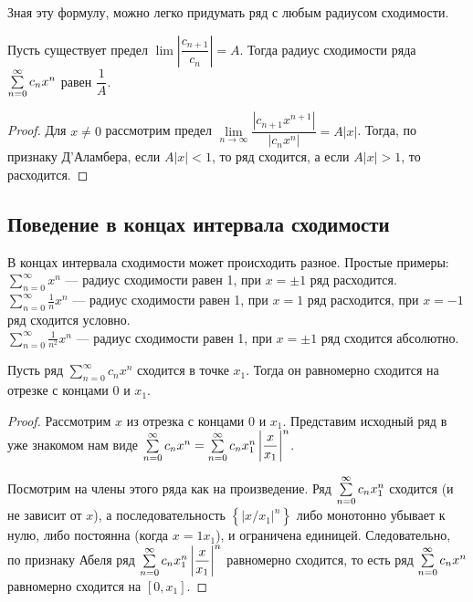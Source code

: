 \documentclass[a4paper, 12pt]{article}
\begin{document}
Зная эту формулу, можно легко придумать ряд с любым радиусом сходимости.

\begin{Statement}
Пусть существует предел $\lim \left|\dfrac{c_{n+1}}{c_n}  \right| = A$. Тогда радиус сходимости ряда $\sum\limits_{n=0}^{\infty} c_nx^n$ равен $\dfrac{1}{A}$.
\end{Statement}

\begin{proof}
Для $x \neq 0$ рассмотрим предел $\lim\limits_{n \to \infty} \dfrac{|c_{n+1}x^{n+1}|}{|c_nx^n|} = A|x|$. Тогда, по признаку Д'Аламбера, если $A|x| < 1$, то ряд сходится, а если $A|x| > 1$, то расходится.
\end{proof}

\subsection{Поведение в концах интервала сходимости}

В концах интервала сходимости может происходить разное.
Простые примеры:
\\$\sum\limits_{n = 0}^{\infty}x^n$ --- радиус сходимости равен 1, при $x= \pm1$ ряд расходится.
\\$\sum\limits_{n = 0}^{\infty}\frac{1}{n} x^n$ --- радиус сходимости равен 1, при $x= 1$ ряд расходится, при $x = -1$ ряд сходится условно.
\\$\sum\limits_{n = 0}^{\infty}\frac{1}{n^2} x^n$ --- радиус сходимости равен 1, при $x= \pm 1$ ряд сходится абсолютно.



\begin{Theorem} [Абеля II]
	Пусть ряд $\sum\limits_{n = 0}^{\infty}c_n x^n$ сходится в точке $x_1$. Тогда он равномерно сходится на отрезке с концами $0$ и $x_1$.
\end{Theorem}

\begin{proof}
Рассмотрим $x$ из отрезка с концами 0 и $x_1$. Представим исходный ряд в уже знакомом нам виде $\sum\limits_{n=0}^{\infty} c_n x^n = \sum\limits_{n=0}^{\infty} c_n x_1^n \left|\dfrac{x}{x_1} \right|^n$.

Посмотрим на члены этого ряда как на произведение. Ряд $\sum\limits_{n=0}^{\infty} c_nx_1^n$ сходится (и не зависит от $x$), а последовательность $\left\{\left|x/x_1\right|^n \right\}$ либо монотонно убывает к нулю, либо постоянна (когда $x=1x_1$), и ограничена единицей. Следовательно, по признаку Абеля ряд $\sum\limits_{n=0}^{\infty} c_n x_1^n \left|\dfrac{x}{x_1} \right|^n$ равномерно сходится, то есть ряд $\sum\limits_{n=0}^{\infty} c_nx^n$ равномерно сходится на $[0, x_1]$.
\end{proof}
\end{document}
